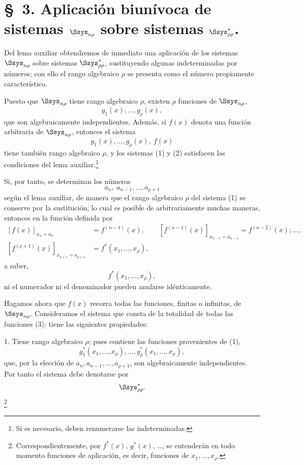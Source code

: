 \documentclass[11pt]{article}
\begin{document}
\section*{\S\ 3. Aplicación biunívoca de sistemas $\Ssys_{n\rho}$ sobre sistemas $\Ssys^*_{\rho\rho}$.}

Del lema auxiliar obtendremos de inmediato una aplicación de los sistemas $\Ssys_{n\rho}$ sobre sistemas $\Ssys^*_{\rho\rho}$, sustituyendo algunas indeterminadas por números; con ello el rango algebraico $\rho$ se presenta como el número propiamente característico.

Puesto que $\Ssys_{n\rho}$ tiene rango algebraico $\rho$, existen $\rho$ funciones de $\Ssys_{n\rho}$,
\begin{equation}
  g_1(x),\ldots,g_\rho(x),
\tag{1}
\end{equation}
que son algebraicamente independientes. Además, si $f(x)$ denota una función arbitraria de $\Ssys_{n\rho}$, entonces el sistema
\begin{equation}
  g_1(x),\ldots,g_\rho(x),\ f(x)
\tag{2}
\end{equation}
tiene también rango algebraico $\rho$, y los sistemas (1) y (2) satisfacen las condiciones del lema auxiliar.\footnote{Si es necesario, deben renumerarse las indeterminadas.}

Si, por tanto, se determinan los números
\[
  a_n,\ a_{n-1},\ldots,a_{\rho+1}
\]
según el lema auxiliar, de manera que el rango algebraico $\rho$ del sistema (1) se conserve por la sustitución, lo cual es posible de arbitrariamente muchas maneras, entonces en la función definida por
\[
\begin{aligned}
 [f(x)]_{x_n=a_n}&=f^{(n-1)}(x),\qquad
 [f^{(n-1)}(x)]_{x_{n-1}=a_{n-1}}=f^{(n-2)}(x);\ldots,\\
 [f^{(\rho+1)}(x)]_{x_{\rho+1}=a_{\rho+1}}&=f^*(x_1,\ldots,x_\rho),
\end{aligned}
\]
a saber,
\begin{equation}
  f^*(x_1,\ldots,x_\rho),
\tag{3}
\end{equation}
ni el numerador ni el denominador pueden anularse idénticamente.

Hagamos ahora que $f(x)$ recorra todas las funciones, finitas o infinitas, de $\Ssys_{n\rho}$. Consideramos el sistema que consta de la totalidad de todas las funciones (3); tiene las siguientes propiedades:

1. Tiene rango algebraico $\rho$; pues contiene las funciones provenientes de (1),
\[
  g_1^*(x_1,\ldots,x_\rho),\ldots,g_\rho^*(x_1,\ldots,x_\rho),
\]
que, por la elección de $a_n,a_{n-1},\ldots,a_{\rho+1}$, son algebraicamente independientes. Por tanto el sistema debe denotarse por
\[
  \Ssys^*_{\rho\rho}.
\]
\footnote{Correspondientemente, por $f^*(x)$, $g^*(x)$, \ldots, se entenderán en todo momento funciones de aplicación, es decir, funciones de $x_1,\ldots,x_\rho$.}
\end{document}

